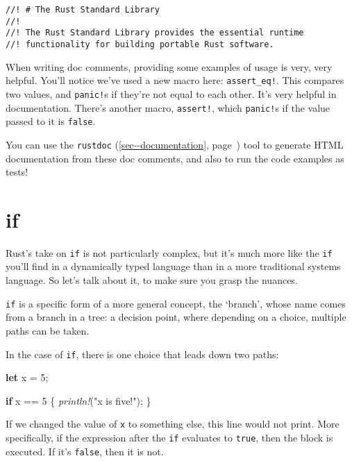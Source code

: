 \documentclass[a4paper,]{book}
\renewcommand*{\hypertarget}[3][\ar]{%
  \def\ar{#2}%
  \label{#1}%
  #3}
\renewcommand*{\hyperlink}[2]{%
 #2 (\autoref{#1}, page~\pageref{#1})}
\newenvironment{Shaded}{\begin{snugshade}}{\end{snugshade}}
\newcommand{\KeywordTok}[1]{\textcolor[rgb]{0.13,0.29,0.53}{\textbf{{#1}}}}
\newcommand{\DecValTok}[1]{\textcolor[rgb]{0.00,0.00,0.81}{{#1}}}
\newcommand{\StringTok}[1]{\textcolor[rgb]{0.31,0.60,0.02}{{#1}}}
\newcommand{\PreprocessorTok}[1]{\textcolor[rgb]{0.56,0.35,0.01}{\textit{{#1}}}}
\newcommand{\NormalTok}[1]{{#1}}
\begin{document}
\begin{verbatim}
//! # The Rust Standard Library
//!
//! The Rust Standard Library provides the essential runtime
//! functionality for building portable Rust software.
\end{verbatim}

When writing doc comments, providing some examples of usage is very,
very helpful. You'll notice we've used a new macro here:
\texttt{assert\_eq!}. This compares two values, and \texttt{panic!}s if
they're not equal to each other. It's very helpful in documentation.
There's another macro, \texttt{assert!}, which \texttt{panic!}s if the
value passed to it is \texttt{false}.

You can use the \protect\hyperlink{sec--documentation}{\texttt{rustdoc}}
tool to generate HTML documentation from these doc comments, and also to
run the code examples as tests!

\hypertarget{sec--if}{\section{if}\label{sec--if}}

Rust's take on \texttt{if} is not particularly complex, but it's much
more like the \texttt{if} you'll find in a dynamically typed language
than in a more traditional systems language. So let's talk about it, to
make sure you grasp the nuances.

\texttt{if} is a specific form of a more general concept, the `branch',
whose name comes from a branch in a tree: a decision point, where
depending on a choice, multiple paths can be taken.

In the case of \texttt{if}, there is one choice that leads down two
paths:

\begin{Shaded}
\begin{Highlighting}[]
\KeywordTok{let} \NormalTok{x = }\DecValTok{5}\NormalTok{;}

\KeywordTok{if} \NormalTok{x == }\DecValTok{5} \NormalTok{\{}
    \PreprocessorTok{println!}\NormalTok{(}\StringTok{"x is five!"}\NormalTok{);}
\NormalTok{\}}
\end{Highlighting}
\end{Shaded}

If we changed the value of \texttt{x} to something else, this line would
not print. More specifically, if the expression after the \texttt{if}
evaluates to \texttt{true}, then the block is executed. If it's
\texttt{false}, then it is not.
\end{document}

